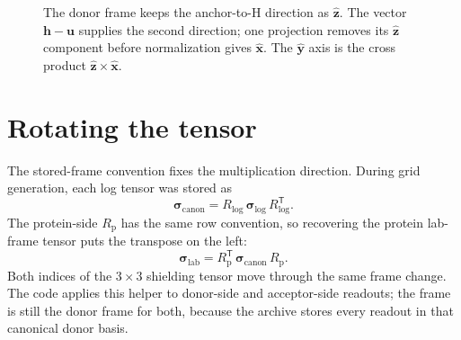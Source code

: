 \documentclass[11pt]{article}
\begin{document}
\begin{figure}[ht]
\centering
{}
\caption{The donor frame keeps the anchor-to-H direction as
\(\hat{\bm z}\). The vector \(\bm h-\bm u\) supplies the second direction; one
projection removes its \(\hat{\bm z}\) component before normalization gives
\(\hat{\bm x}\). The \(\hat{\bm y}\) axis is the cross product
\(\hat{\bm z}\times\hat{\bm x}\).}
\end{figure}

\section{Rotating the tensor}

The stored-frame convention fixes the multiplication direction. During grid
generation, each log tensor was stored as
\[
  \bm\sigma_{\mathrm{canon}} =
  R_{\mathrm{log}}\,
  \bm\sigma_{\mathrm{log}}\,
  R_{\mathrm{log}}^{\mathsf T}.
\]
The protein-side \(R_{\mathrm p}\) has the same row convention, so recovering
the protein lab-frame tensor puts the transpose on the left:
\[
  \bm\sigma_{\mathrm{lab}} =
  R_{\mathrm p}^{\mathsf T}\,
  \bm\sigma_{\mathrm{canon}}\,
  R_{\mathrm p}.
\]
Both indices of the \(3\times3\) shielding tensor move through the same frame
change. The code applies this helper to donor-side and acceptor-side readouts;
the frame is still the donor frame for both, because the archive stores every
readout in that canonical donor basis.
\end{document}
